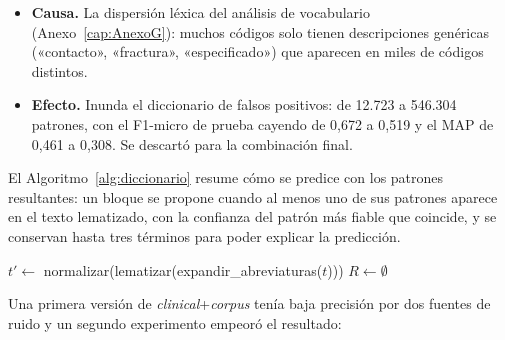\begin{itemize}
 \item \textbf{Causa.} La dispersión léxica del análisis de vocabulario (Anexo~\ref{cap:AnexoG}): muchos códigos solo tienen descripciones genéricas («contacto», «fractura», «especificado») que aparecen en miles de códigos distintos.
 \item \textbf{Efecto.} Inunda el diccionario de falsos positivos: de 12.723 a 546.304 patrones, con el F1-micro de prueba cayendo de 0,672 a 0,519 y el MAP de 0,461 a 0,308. Se descartó para la combinación final.
\end{itemize}

El Algoritmo~\ref{alg:diccionario} resume cómo se predice con los patrones resultantes: un bloque se propone cuando al menos uno de sus patrones aparece en el texto lematizado, con la confianza del patrón más fiable que coincide, y se conservan hasta tres términos para poder explicar la predicción.

\begin{algorithm}[ht]
\DontPrintSemicolon
\caption{Clasificación por diccionario de bloques.}
\label{alg:diccionario}
$t' \leftarrow$ normalizar(lematizar(expandir\_abreviaturas($t$)))\;
$R \leftarrow \emptyset$\;
\;
\end{algorithm}

Una primera versión de \emph{clinical}+\emph{corpus} tenía baja precisión por dos fuentes de ruido y un segundo experimento empeoró el resultado:

